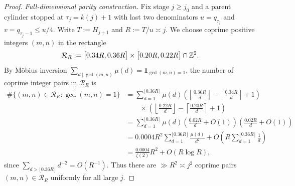 \begin{proof}
\emph{Full-dimensional parity construction.} Fix stage $j\ge j_0$ and a parent
cylinder stopped at $\tau_j=k(j)+1$ with last two denominators $u=q_{\tau_j}$
and $v=q_{\tau_j-1}\le u/4$. Write $T:=H_{j+1}$ and $R:=T/u\asymp j$. We choose
coprime positive integers $(m,n)$ in the rectangle
\[
\mathcal R_R:=\bigl[0.34R,0.36R\bigr]\times\bigl[0.20R,0.22R\bigr]\cap\mathbb{Z}^2.
\]
By M\"obius inversion $\sum_{d\mid\gcd(m,n)}\mu(d)=\mathbf 1_{\gcd(m,n)=1}$, the
number of coprime integer pairs in $\mathcal R_R$ is
\begin{align*}
\#\{(m,n)\in\mathcal R_R:\gcd(m,n)=1\}
&=\sum_{d=1}^{\lfloor0.36R\rfloor}\mu(d)
\left(\left\lfloor\frac{0.36R}{d}\right\rfloor-\left\lceil\frac{0.34R}{d}\right\rceil+1\right)\\
&\qquad\times\left(\left\lfloor\frac{0.22R}{d}\right\rfloor-\left\lceil\frac{0.20R}{d}\right\rceil+1\right)\\
&=\sum_{d=1}^{\lfloor0.36R\rfloor}\mu(d)
\left(\frac{0.02R}{d}+O(1)\right)\left(\frac{0.02R}{d}+O(1)\right)\\
&=0.0004R^2\sum_{d=1}^{\lfloor0.36R\rfloor}\frac{\mu(d)}{d^2}
+O\left(R\sum_{d=1}^{\lfloor0.36R\rfloor}\frac1d\right)\\
&=\frac{0.0004}{\zeta(2)}R^2+O(R\log R),
\end{align*}
since $\sum_{d>\lfloor0.36R\rfloor}d^{-2}=O(R^{-1})$. Thus there are $\gg R^2\asymp j^2$
coprime pairs $(m,n)\in\mathcal R_R$ uniformly for all large $j$.


\end{proof}

